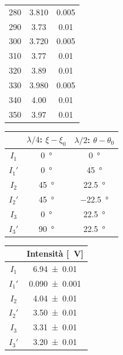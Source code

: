 \documentclass[10pt,oneside,a4paper]{article}
\begin{document}
\begin{minipage}[t]{0.3\linewidth}
\begin{center}
\begin{tabular}{c|c|c}
280 &    3.810 &            0.005 \\
290 &    3.73 &            0.01 \\
300 &    3.720 &            0.005 \\
310 &    3.77 &            0.01 \\
320 &    3.89 &            0.01 \\
330 &    3.980 &            0.005 \\
340 &    4.00 &            0.01 \\
350 &    3.97 &            0.01 \\
\bottomrule
\end{tabular}
\end{center}
\end{minipage}

\vspace{1cm}
\begin{minipage}[t]{.33\linewidth}
\begin{center}
\label{tab:misuraStokes}
\begin{tabular}{c|c|c}
 &  $\lambda / 4$: $\xi-\xi_0$ & $\lambda / 2$: $\theta-\theta_0$  \\
\hline
     $I_1$  &        \SI{0}{\degree} &         \SI{0}{\degree} \\
     $I_1'$  &       \SI{0}{\degree} &         \SI{45}{\degree} \\
     \hline 
     $I_2$  &        \SI{45}{\degree} &         \SI{22.5}{\degree} \\
     $I_2'$  &       \SI{45}{\degree} &         \SI{-22.5}{\degree} \\
     \hline 
     $I_3$  &        \SI{0}{\degree} &         \SI{22.5}{\degree} \\
     $I_3'$	&		 \SI{90}{\degree} &         \SI{22.5}{\degree} \\
\hline
\end{tabular}
\end{center}
\end{minipage}
\hspace{1em}
\begin{minipage}[t]{.33\linewidth}
\begin{center}
\label{tab:stokesBS}
\begin{tabular}{c|c}
& Intensità [\SI{}{V}]  \\
\hline
     $I_1$  &        \SI{6.94 \pm 0.01}{} \\
     $I_1'$  &       \SI{0.090 \pm 0.001}{} \\
     \hline 
     $I_2$  &        \SI{4.04 \pm 0.01}{} \\
     $I_2'$  &       \SI{3.50 \pm 0.01}{} \\
     \hline 
     $I_3$  &        \SI{3.31 \pm 0.01}{} \\
     $I_3'$	&		 \SI{3.20 \pm 0.01}{} \\
\hline
\end{tabular}
\end{center}
\end{minipage}
\end{document}
